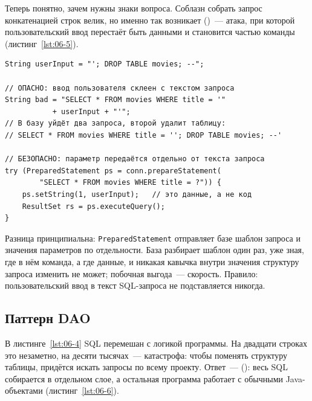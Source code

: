 Теперь понятно, зачем нужны знаки вопроса. Соблазн собрать запрос
конкатенацией строк велик, но именно так возникает 
()~--- атака, при которой пользовательский ввод перестаёт
быть данными и становится частью команды (листинг~\ref{lst:06-5}).

\begin{listing}[H]
\begin{verbatim}
String userInput = "'; DROP TABLE movies; --";

// ОПАСНО: ввод пользователя склеен с текстом запроса
String bad = "SELECT * FROM movies WHERE title = '"
           + userInput + "'";
// В базу уйдёт два запроса, второй удалит таблицу:
// SELECT * FROM movies WHERE title = ''; DROP TABLE movies; --'

// БЕЗОПАСНО: параметр передаётся отдельно от текста запроса
try (PreparedStatement ps = conn.prepareStatement(
        "SELECT * FROM movies WHERE title = ?")) {
    ps.setString(1, userInput);   // это данные, а не код
    ResultSet rs = ps.executeQuery();
}
\end{verbatim}
\caption{Опасная конкатенация и безопасный параметр}
\label{lst:06-5}
\end{listing}

Разница принципиальна: \texttt{PreparedStatement} отправляет базе шаблон
запроса и значения параметров по отдельности. База разбирает шаблон один раз,
уже зная, где в нём команда, а где данные, и никакая кавычка внутри значения
структуру запроса изменить не может; побочная выгода~--- скорость. Правило:
пользовательский ввод в текст SQL-запроса не подставляется никогда.

\subsection{Паттерн DAO}

В листинге~\ref{lst:06-4} SQL перемешан с логикой программы. На двадцати
строках это незаметно, на десяти тысячах~--- катастрофа: чтобы поменять
структуру таблицы, придётся искать запросы по всему проекту. Ответ~---
 (): весь SQL собирается в отдельном слое, а
остальная программа работает с обычными Java-объектами
(листинг~\ref{lst:06-6}).

